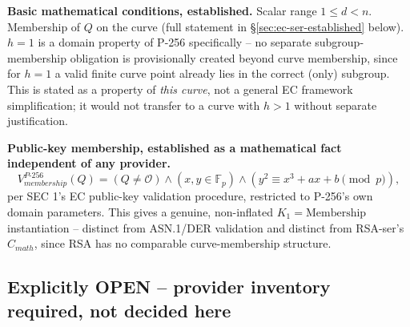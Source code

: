 \documentclass[11pt,a4paper]{article}
\begin{document}
\textbf{Basic mathematical conditions, established.} Scalar range $1\le d < n$. Membership of $Q$ on the curve (full statement in \S\ref{sec:ec-ser-established} below). $h=1$ is a domain property of P-256 specifically -- no separate subgroup-membership obligation is provisionally created beyond curve membership, since for $h=1$ a valid finite curve point already lies in the correct (only) subgroup. This is stated as a property of \emph{this curve}, not a general EC framework simplification; it would not transfer to a curve with $h>1$ without separate justification.

\textbf{Public-key membership, established as a mathematical fact independent of any provider.}
\[
V_{membership}^{P\text{-}256}(Q) = (Q\neq\mathcal{O}) \wedge (x,y\in\mathbb{F}_p) \wedge (y^2 \equiv x^3+ax+b \pmod p),
\]
per SEC 1's EC public-key validation procedure, restricted to P-256's own domain parameters. This gives a genuine, non-inflated $K_1=\text{Membership}$ instantiation -- distinct from ASN.1/DER validation and distinct from RSA-ser's $C_{math}$, since RSA has no comparable curve-membership structure.

\subsection{Explicitly OPEN -- provider inventory required, not decided here}\label{sec:ec-ser-open}
\end{document}
